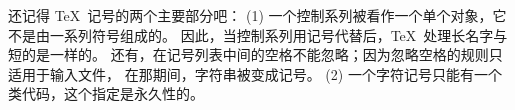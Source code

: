 \danger \1还记得 \TeX\ 记号的两个主要部分吧：
(1) 一个控制系列被看作一个单个对象，它不是由一系列符号组成的。%
因此，当控制系列用记号代替后，\TeX\ 处理长名字与短的是一样的。%
还有，在记号列表中间的空格不能忽略；因为忽略空格的规则只适用于输入文件，
在那期间，字符串被变成记号。%
(2) 一个字符记号只能有一个类代码，这个指定是永久性的。%
